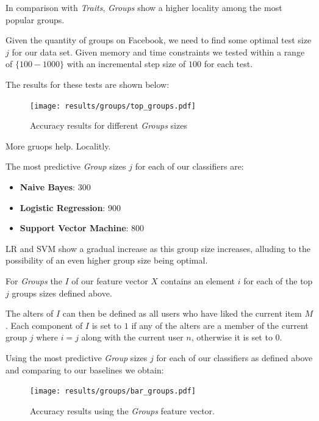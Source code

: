\clearpage

In comparison with \emph{Traits}, \emph{Groups} show a higher locality among the most popular groups.

Given the quantity of groups on Facebook, we need to find some optimal test size $j$ for our data set. 
Given memory and time constraints we tested within a range of $\{100-1000\}$ with an incremental step size of $100$ for each test.

\clearpage

The results for these tests are shown below:

\begin{figure}[h]
	\begin{center}
		\texttt{[image: results/groups/top\_groups.pdf]}
		\caption{Accuracy results for different \emph{Groups} sizes}
	\end{center}
\end{figure}

More gruops help. Localitly.

The most predictive \emph{Group} sizes $j$ for each of our classifiers are:
\begin{itemize}
\item \textbf{Naive Bayes}: 300
\item \textbf{Logistic Regression}: 900
\item \textbf{Support Vector Machine}: 800
\end{itemize}

LR and SVM show a gradual increase as this group size increases, alluding to the possibility of an even higher group size being optimal.

For \emph{Groups} the $I$ of our feature vector $X$ contains an element $i$ for each of the top $j$ groups sizes defined above.

The alters of $I$ can then be defined as all users who have liked the current item $M$.
Each component of $I$ is set to $1$ if any of the alters are a member of the current group $j$ where $i = j$ along with the 
current user $n$, otherwise it is set to $0$.

\clearpage

Using the most predictive \emph{Group} sizes $j$ for each of our classifiers as defined above and comparing to our baselines we obtain:

\begin{figure}[h]
	\begin{center}
		\texttt{[image: results/groups/bar\_groups.pdf]}
		\caption{Accuracy results using the \emph{Groups} feature vector.}
	\end{center}
\end{figure}

